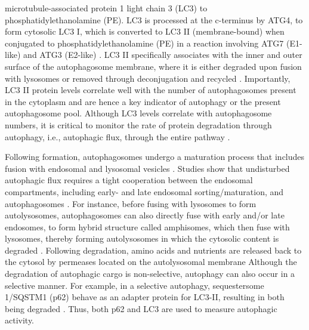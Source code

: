 microtubule-associated protein 1 light chain 3 (LC3) to phosphatidylethanolamine (PE). LC3 is processed at the c-terminus by ATG4, to form cytosolic LC3 I, which is converted to LC3 II (membrane-bound) when conjugated to phosphatidylethanolamine (PE) in a reaction involving ATG7 (E1-like) and ATG3 (E2-like) \citep{kabeya2000,Tanida2004}. LC3 II specifically associates with the inner and outer surface of the autophagosome membrane, where it is either degraded upon fusion with lysosomes or removed through deconjugation and recycled \citep{kabeya2000,Mijaljica2012,Tanida2004}. Importantly, LC3 II protein levels correlate well with the number of autophagosomes present in the cytoplasm and are hence a key indicator of autophagy or the present autophagosome pool. Although LC3 levels correlate with autophagosome numbers, it is critical to monitor the rate of protein degradation through autophagy, i.e., autophagic flux, through the entire pathway \citep{klionsky2016,loos2014}. 

Following formation, autophagosomes undergo a maturation process that includes fusion with endosomal and lysosomal vesicles \citep{Eskelinen2005}. Studies show that undisturbed autophagic flux requires a tight cooperation between the endosomal compartments, including early- and late endosomal sorting/maturation, and autophagosomes \citep{Eskelinen2005}. For instance, before fusing with lysosomes to form autolysosomes, autophagosomes can also directly fuse with early and/or late endosomes, to form hybrid structure called amphisomes, which then fuse with lysosomes, thereby forming autolysosomes in which the cytosolic content is degraded \citep{Bell2006,Filimonenko2007,Liou1997}. Following degradation, amino acids and nutrients are released back to the cytosol by permeases located on the autolysosomal membrane \citep{Loos2013} Although the degradation of autophagic cargo is non-selective, autophagy can also occur in a selective manner. For example, in a selective autophagy, sequestersome 1/SQSTM1 (p62) behave as an adapter protein for LC3-II, resulting in both being degraded \citep{Klionsky2005,Singh2011}. Thus, both p62 and LC3 are used to measure autophagic activity. 

